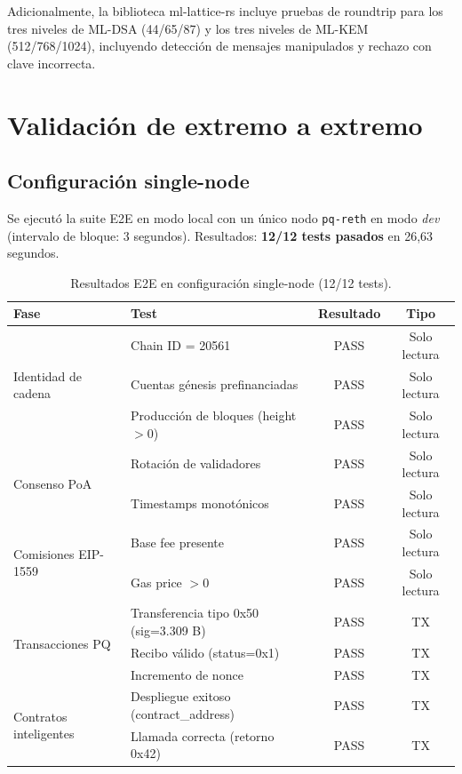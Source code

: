 Adicionalmente, la biblioteca ml-lattice-rs incluye pruebas de roundtrip para los tres niveles de ML-DSA (44/65/87) y los tres niveles de ML-KEM (512/768/1024), incluyendo detección de mensajes manipulados y rechazo con clave incorrecta.


\section{Validación de extremo a extremo}
\label{sec:res_e2e}

\subsection{Configuración single-node}

Se ejecutó la suite E2E en modo local con un único nodo \texttt{pq-reth} en modo \emph{dev} (intervalo de bloque: 3 segundos). Resultados: \textbf{12/12 tests pasados} en 26,63 segundos.

\begin{table}[htbp]
\centering
\caption{Resultados E2E en configuración single-node (12/12 tests).}
\label{tab:e2e_single}
\begin{tabular}{@{}llcc@{}}
\toprule
\textbf{Fase} & \textbf{Test} & \textbf{Resultado} & \textbf{Tipo} \\
\midrule
\multirow{3}{*}{Identidad de cadena} & Chain ID = 20561 & PASS & Solo lectura \\
 & Cuentas génesis prefinanciadas & PASS & Solo lectura \\
 & Producción de bloques (height $> 0$) & PASS & Solo lectura \\
\midrule
\multirow{2}{*}{Consenso PoA} & Rotación de validadores & PASS & Solo lectura \\
 & Timestamps monotónicos & PASS & Solo lectura \\
\midrule
\multirow{2}{*}{Comisiones EIP-1559} & Base fee presente & PASS & Solo lectura \\
 & Gas price $> 0$ & PASS & Solo lectura \\
\midrule
\multirow{3}{*}{Transacciones PQ} & Transferencia tipo 0x50 (sig=3.309 B) & PASS & TX \\
 & Recibo válido (status=0x1) & PASS & TX \\
 & Incremento de nonce & PASS & TX \\
\midrule
\multirow{2}{*}{Contratos inteligentes} & Despliegue exitoso (contract\_address) & PASS & TX \\
 & Llamada correcta (retorno 0x42) & PASS & TX \\
\bottomrule
\end{tabular}
\end{table}


